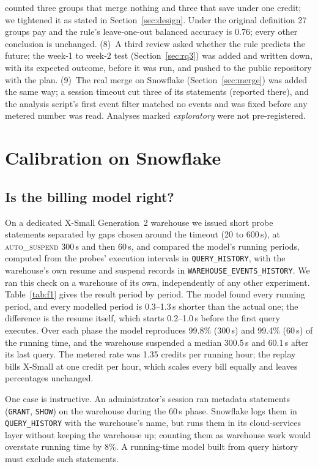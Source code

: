 \documentclass[conference]{IEEEtran}
\newcommand{\autos}{\textsc{auto\_suspend}}
\begin{document}
counted three groups that merge nothing and three that save under one credit; we tightened it as stated in
Section~\ref{sec:design}. Under the original definition 27 groups pay and the rule's leave-one-out balanced accuracy is
0.76; every other conclusion is unchanged. (8)~A third review asked whether the rule predicts the future; the week-1 to
week-2 test (Section~\ref{sec:rq3}) was added and written down, with its expected outcome, before it was run, and pushed to
the public repository with the plan. (9)~The real merge on Snowflake (Section~\ref{sec:merge}) was added the same way; a
session timeout cut three of its statements (reported there), and the analysis script's first event filter matched no
events and was fixed before any metered number was read. Analyses marked \emph{exploratory} were not pre-registered.

\section{Calibration on Snowflake}\label{sec:calib}
\subsection{Is the billing model right?}
On a dedicated X-Small Generation~2 warehouse we issued short probe statements separated by gaps chosen around the timeout
(20 to 600\,s), at \autos{} 300\,s and then 60\,s, and compared the model's running periods, computed from the probes'
execution intervals in \texttt{QUERY\_HISTORY}, with the warehouse's own resume and suspend records in
\texttt{WAREHOUSE\_EVENTS\_HISTORY}. We ran this check on a warehouse of its own, independently of any other experiment.
Table~\ref{tab:f1} gives the result period by period. The model found every running period, and every modelled period is
0.3--1.3\,s shorter than the actual one; the difference is the resume itself, which starts 0.2--1.0\,s before the first
query executes. Over each phase the model reproduces 99.8\% (300\,s) and 99.4\% (60\,s) of the running time, and the
warehouse suspended a median 300.5\,s and 60.1\,s after its last query. The metered rate was 1.35 credits per running hour;
the replay bills X-Small at one credit per hour, which scales every bill equally and leaves percentages unchanged.

One case is instructive. An administrator's session ran metadata statements (\texttt{GRANT}, \texttt{SHOW}) on the warehouse
during the 60\,s phase. Snowflake logs them in \texttt{QUERY\_HISTORY} with the warehouse's name, but runs them in its
cloud-services layer without keeping the warehouse up; counting them as warehouse work would overstate running time by 8\%.
A running-time model built from query history must exclude such statements.
\end{document}
